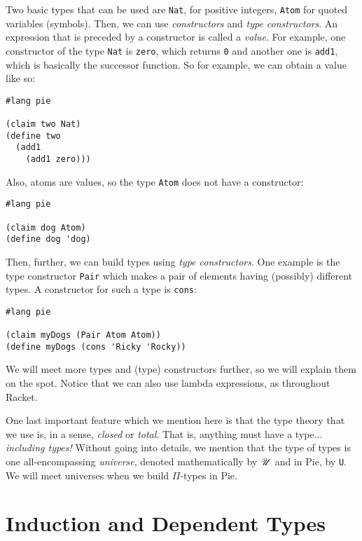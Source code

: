 Two basic types that can be used are \texttt{Nat}, for positive integers,
\texttt{Atom} for quoted variables (symbols). Then, we can use
\emph{constructors} and \emph{type constructors}. An expression that is
preceded by a constructor is called a \emph{value}. For example, one constructor
of the type \texttt{Nat} is \texttt{zero}, which returns \texttt{0} and another
one is \texttt{add1}, which is basically the successor function. So for
example, we can obtain a value like so:
{
  \small
\begin{verbatim}
#lang pie

(claim two Nat)
(define two
  (add1
    (add1 zero)))
\end{verbatim}
}

Also, atoms are values, so the type \texttt{Atom} does not have a constructor:
{
  \small
\begin{verbatim}
#lang pie

(claim dog Atom)
(define dog 'dog)
\end{verbatim}
}

Then, further, we can build types using \emph{type constructors}. One example
is the type constructor \texttt{Pair} which makes a pair of elements having
(possibly) different types. A constructor for such a type is \texttt{cons}:
{
  \small
\begin{verbatim}
#lang pie

(claim myDogs (Pair Atom Atom))
(define myDogs (cons 'Ricky 'Rocky))
\end{verbatim}
}

We will meet more types and (type) constructors further, so we will explain
them on the spot. Notice that we can also use lambda expressions, as
throughout Racket.

One last important feature which we mention here is that the type theory that
we use is, in a sense, \emph{closed} or \emph{total}. That is, anything must
have a type... \emph{including types!} Without going into details, we mention
that the type of types is one all-encompassing \emph{universe}, denoted
mathematically by $ \mathscr{U} $ and in Pie, by \texttt{U}. We will meet universes
when we build $ \Pi $-types in Pie.

\section{Induction and Dependent Types}
\label{sec:induction-pi}

